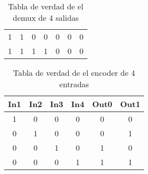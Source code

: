 \begin{table}[H]
\begin{tabular}{|ccc|cccc|}
    \cellcolor[HTML]{34FF34}1           & \cellcolor[HTML]{34FF34}1           & \cellcolor[HTML]{34FF34}0           & \cellcolor[HTML]{FD6864}0             & \cellcolor[HTML]{FD6864}0             & \cellcolor[HTML]{FD6864}0             & \cellcolor[HTML]{FD6864}0             \\
    \cellcolor[HTML]{34FF34}1           & \cellcolor[HTML]{34FF34}1           & \cellcolor[HTML]{34FF34}1           & \cellcolor[HTML]{FD6864}1             & \cellcolor[HTML]{FD6864}0             & \cellcolor[HTML]{FD6864}0             & \cellcolor[HTML]{FD6864}0             \\ \hline
    \end{tabular}
    \caption{Tabla de verdad de el demux de 4 salidas}
    \end{table}

    \begin{table}[H]
        \center
        \begin{tabular}{|cccc|cc|}
        \hline
        \multicolumn{1}{|l}{\textbf{In1}} & \multicolumn{1}{l}{\textbf{In2}} & \multicolumn{1}{l}{\textbf{In3}} & \multicolumn{1}{l|}{\textbf{In4}} & \multicolumn{1}{l}{\textbf{Out0}} & \multicolumn{1}{l|}{\textbf{Out1}} \\ \hline
        \cellcolor[HTML]{34FF34}1                                 & \cellcolor[HTML]{34FF34}0                                & \cellcolor[HTML]{34FF34}0                                & \cellcolor[HTML]{34FF34}0                                 & \cellcolor[HTML]{FD6864}0                                 & \cellcolor[HTML]{FD6864}0                                  \\
        \cellcolor[HTML]{34FF34}0                                 & \cellcolor[HTML]{34FF34}1                                & \cellcolor[HTML]{34FF34}0                                & \cellcolor[HTML]{34FF34}0                                 & \cellcolor[HTML]{FD6864}0                                 & \cellcolor[HTML]{FD6864}1                                  \\
        \cellcolor[HTML]{34FF34}0                                 & \cellcolor[HTML]{34FF34}0                                & \cellcolor[HTML]{34FF34}1                                & \cellcolor[HTML]{34FF34}0                                 & \cellcolor[HTML]{FD6864}1                                 & \cellcolor[HTML]{FD6864}0                                  \\
        \cellcolor[HTML]{34FF34}0                                 & \cellcolor[HTML]{34FF34}0                                & \cellcolor[HTML]{34FF34}0                                & \cellcolor[HTML]{34FF34}1                                 & \cellcolor[HTML]{FD6864}1                                 & \cellcolor[HTML]{FD6864}1                                  \\ \hline
        \end{tabular}
        \caption{Tabla de verdad de el encoder de 4 entradas}
        \end{table}
